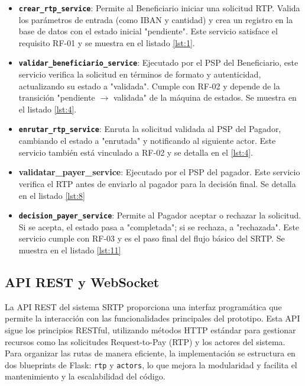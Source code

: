 \begin{itemize}
    \item \textbf{\texttt{crear\_rtp\_service}}: Permite al Beneficiario iniciar una solicitud RTP. Valida los parámetros de entrada (como IBAN y cantidad) y crea un registro en la base de datos con el estado inicial "pendiente". Este servicio satisface el requisito RF-01 y se muestra en el listado \ref{lst:1}.
    \item \textbf{\texttt{validar\_beneficiario\_service}}: Ejecutado por el PSP del Beneficiario, este servicio verifica la solicitud en términos de formato y autenticidad, actualizando su estado a "validada". Cumple con RF-02 y depende de la transición "pendiente $\rightarrow$ validada" de la máquina de estados. Se muestra en el listado \ref{lst:4}.
    \item \textbf{\texttt{enrutar\_rtp\_service}}: Enruta la solicitud validada al PSP del Pagador, cambiando el estado a "enrutada" y notificando al siguiente actor. Este servicio también está vinculado a RF-02 y se detalla en el \ref{lst:4}.
    \item \textbf{\textbf{validatar\_payer\_service}}: Ejecutado por el PSP del pagador. Este servicio verifica el RTP antes de enviarlo al pagador para la decisión final. Se detalla en el listado \ref{lst:8}
    \item \textbf{\texttt{decision\_payer\_service}}: Permite al Pagador aceptar o rechazar la solicitud. Si se acepta, el estado pasa a "completada"; si se rechaza, a "rechazada". Este servicio cumple con RF-03 y es el paso final del flujo básico del SRTP. Se muestra en el listado \ref{lst:11}
\end{itemize}

\subsection{API REST y WebSocket}
\label{subsec:api_ws}

La API REST del sistema SRTP proporciona una interfaz programática que permite la interacción con las funcionalidades principales del prototipo. Esta API sigue los principios RESTful, utilizando métodos HTTP estándar para gestionar recursos como las solicitudes Request-to-Pay (RTP) y los actores del sistema. Para organizar las rutas de manera eficiente, la implementación se estructura en dos blueprints de Flask: \texttt{rtp} y \texttt{actors}, lo que mejora la modularidad y facilita el mantenimiento y la escalabilidad del código.

